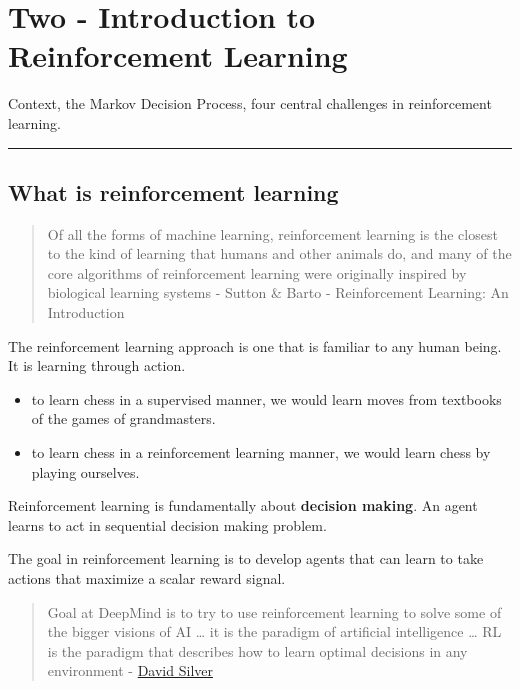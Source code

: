 \documentclass[]{article}
\date{}
\providecommand{\tightlist}{%
  \setlength{\itemsep}{0pt}\setlength{\parskip}{0pt}}
\begin{document}
\hypertarget{two---introduction-to-reinforcement-learning}{%
\section{Two - Introduction to Reinforcement
Learning}\label{two---introduction-to-reinforcement-learning}}

Context, the Markov Decision Process, four central challenges in
reinforcement learning.

\begin{center}\rule{0.5\linewidth}{\linethickness}\end{center}

\hypertarget{what-is-reinforcement-learning}{%
\subsection{What is reinforcement
learning}\label{what-is-reinforcement-learning}}

\begin{quote}
Of all the forms of machine learning, reinforcement learning is the
closest to the kind of learning that humans and other animals do, and
many of the core algorithms of reinforcement learning were originally
inspired by biological learning systems - Sutton \& Barto -
Reinforcement Learning: An Introduction
\end{quote}

The reinforcement learning approach is one that is familiar to any human
being. It is learning through action.

\begin{itemize}
\tightlist
\item
  to learn chess in a supervised manner, we would learn moves from
  textbooks of the games of grandmasters.
\item
  to learn chess in a reinforcement learning manner, we would learn
  chess by playing ourselves.
\end{itemize}

Reinforcement learning is fundamentally about \textbf{decision making}.
An agent learns to act in sequential decision making problem.

The goal in reinforcement learning is to develop agents that can learn
to take actions that maximize a scalar reward signal.

\begin{quote}
Goal at DeepMind is to try to use reinforcement learning to solve some
of the bigger visions of AI \ldots{} it is the paradigm of artificial
intelligence \ldots{} RL is the paradigm that describes how to learn
optimal decisions in any environment -
\href{https://www.youtube.com/watch?v=M5a6HasTHs4}{David Silver}
\end{quote}
\end{document}
